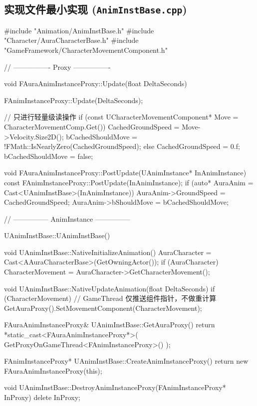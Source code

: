 \documentclass[10pt,openright,oneside,CJKmath]{MyBook}
\begin{document}
\subsection{实现文件最小实现 (\texttt{AnimInstBase.cpp})}
\begin{code}[caption={AnimInstBase.cpp}]
#include "Animation/AnimInstBase.h"
#include "Character/AuraCharacterBase.h"
#include "GameFramework/CharacterMovementComponent.h"

// ---------------- Proxy ----------------

void FAuraAnimInstanceProxy::Update(float DeltaSeconds)
{
    FAnimInstanceProxy::Update(DeltaSeconds);

    // 只进行轻量级读操作
    if (const UCharacterMovementComponent* Move = CharacterMovementComp.Get())
    {
        CachedGroundSpeed = Move->Velocity.Size2D();
        bCachedShouldMove = !FMath::IsNearlyZero(CachedGroundSpeed);
    }
    else
    {
        CachedGroundSpeed = 0.f;
        bCachedShouldMove = false;
    }
}

void FAuraAnimInstanceProxy::PostUpdate(UAnimInstance* InAnimInstance) const
{
    FAnimInstanceProxy::PostUpdate(InAnimInstance);
    if (auto* AuraAnim = Cast<UAnimInstBase>(InAnimInstance))
    {
        AuraAnim->GroundSpeed = CachedGroundSpeed;
        AuraAnim->bShouldMove = bCachedShouldMove;
    }
}

// --------------- AnimInstance ---------------

UAnimInstBase::UAnimInstBase() {}

void UAnimInstBase::NativeInitializeAnimation()
{
    AuraCharacter = Cast<AAuraCharacterBase>(GetOwningActor());
    if (AuraCharacter)
    {
        CharacterMovement = AuraCharacter->GetCharacterMovement();
    }
}

void UAnimInstBase::NativeUpdateAnimation(float DeltaSeconds)
{
    if (CharacterMovement)
    {
        // GameThread 仅推送组件指针，不做重计算
        GetAuraProxy().SetMovementComponent(CharacterMovement);
    }
}

FAuraAnimInstanceProxy& UAnimInstBase::GetAuraProxy()
{
    return *static_cast<FAuraAnimInstanceProxy*>(
        GetProxyOnGameThread<FAnimInstanceProxy>()
    );
}

FAnimInstanceProxy* UAnimInstBase::CreateAnimInstanceProxy()
{
    return new FAuraAnimInstanceProxy(this);
}

void UAnimInstBase::DestroyAnimInstanceProxy(FAnimInstanceProxy* InProxy)
{
    delete InProxy;
}
\end{code}
\end{document}
